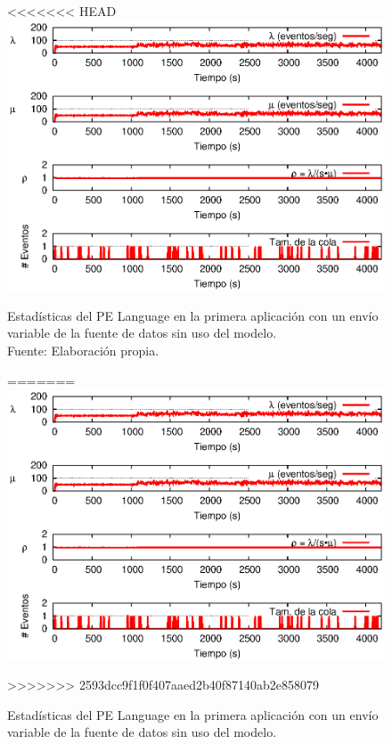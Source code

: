 \begin{figure}[!ht]
<<<<<<< HEAD
    \centering
    \captionsetup{justification=centering}
    \includegraphics[scale=1]{images/exp/app1/normal/sm/statusLanguagePE.eps}
    \caption[Estadísticas del PE Language en la primera aplicación con un envío variable de la fuente de datos sin uso del modelo.]{Estadísticas del PE Language en la primera aplicación con un envío variable de la fuente de datos sin uso del modelo.\\Fuente: Elaboración propia.}
=======
\centering
    \includegraphics[scale=1.1]{images/exp/app1/normal/sm/statusLanguagePE.eps}
    \caption{Estad\'isticas del PE Language en la primera aplicaci\'on con un env\'io variable de la fuente de datos sin uso del modelo.}
>>>>>>> 2593dcc9f1f0f407aaed2b40f87140ab2e858079
    \label{fig:app1-normal-statusLanguagePE-sm}
\end{figure}

